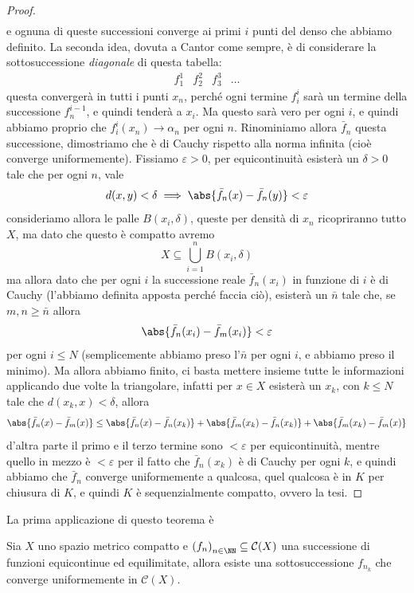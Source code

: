 \documentclass[11pt]{scrartcl}
\begin{document}
\begin{proof}
$$\begin{array}{ccc}
		\end{array}
		$$
		e ognuna di queste successioni converge ai primi $i$ punti del denso che abbiamo definito. La seconda idea, dovuta a Cantor come sempre, è di considerare la sottosuccessione \textit{diagonale} di questa tabella:
		$$
		\begin{array}{cccc}
			f^1_1 & f^2_2 & f^3_3 & \dots
		\end{array}
		$$
		questa convergerà in tutti i punti $x_n$, perché ogni termine $f^i_i$ sarà un termine della successione $f^{i-1}_{n}$, e quindi tenderà a $x_i$. Ma questo sarà vero per ogni $i$, e quindi abbiamo proprio che $f^i_i(x_n)\to \alpha_n$ per ogni $n$. Rinominiamo allora $\bar{f}_n$ questa successione, dimostriamo che è di Cauchy rispetto alla norma infinita (cioè converge uniformemente). Fissiamo $\varepsilon>0$, per equicontinuità esisterà un $\delta>0$ tale che per ogni $n$, vale
		$$d(x,y)<\delta \implies\abs{\bar{f}_n(x)-\bar{f}_n(y)}<\varepsilon$$
		consideriamo allora le palle $B(x_i,\delta)$, queste per densità di $x_n$ ricopriranno tutto $X$, ma dato che questo è compatto avremo
		$$X\subseteq \bigcup_{i=1}^n B(x_i,\delta)$$
		ma allora dato che per ogni $i$ la successione reale $\bar{f}_n(x_i)$ in funzione di $i$ è di Cauchy (l'abbiamo definita apposta perché faccia ciò), esisterà un $\bar{n}$ tale che, se $m,n\ge \bar{n}$ allora
		$$\abs{\bar{f}_n(x_i)-\bar{f}_m(x_i)}<\varepsilon$$ 
		per ogni $i\le N$ (semplicemente abbiamo preso l'$\bar{n}$ per ogni $i$, e abbiamo preso il minimo). Ma allora abbiamo finito, ci basta mettere insieme tutte le informazioni applicando due volte la triangolare, infatti per $x\in X$ esisterà un $x_k$, con $k\le N$ tale che $d(x_k,x)<\delta$, allora
		$$\abs{\bar{f}_n(x)-\bar{f}_m(x)}\le \abs{\bar{f}_n(x)-\bar{f}_n(x_k)}+\abs{\bar{f}_m(x_k)-\bar{f}_n(x_k)}+\abs{\bar{f}_m(x_k)-\bar{f}_m(x)}$$
		d'altra parte il primo e il terzo termine sono $<\varepsilon$ per equicontinuità, mentre quello in mezzo è $<\varepsilon$ per il fatto che $\bar{f}_n(x_k)$ è di Cauchy per ogni $k$, e quindi abbiamo che $\bar{f}_n$ converge uniformemente a qualcosa, quel qualcosa è in $K$ per chiusura di $K$, e quindi $K$ è sequenzialmente compatto, ovvero la tesi.
	\end{proof}
	La prima applicazione di questo teorema è 
	\begin{corollary}
		Sia $X$ uno spazio metrico compatto e $\left(f_n\right)_{n\in\NN}\subseteq \mathcal{C}(X)$ una successione di funzioni equicontinue ed equilimitate, allora esiste una sottosuccessione $f_{n_k}$ che converge uniformemente in $\mathcal{C}(X)$.
	\end{corollary}
\end{document}
